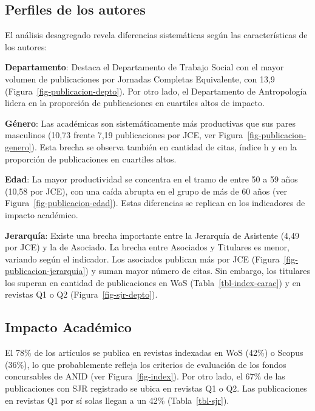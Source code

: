 \documentclass[
  spanish,
  a4paper,
  oneside]{scrbook}
\begin{document}
\subsection*{Perfiles de los autores}\label{perfiles-de-los-autores}

El análisis desagregado revela diferencias sistemáticas según las
características de los autores:

\textbf{Departamento}: Destaca el Departamento de Trabajo Social con el
mayor volumen de publicaciones por Jornadas Completas Equivalente, con
13,9 (Figura~\ref{fig-publicacion-depto}). Por otro lado, el
Departamento de Antropología lidera en la proporción de publicaciones en
cuartiles altos de impacto.

\textbf{Género}: Las académicas son sistemáticamente más productivas que
sus pares masculinos (10,73 frente 7,19 publicaciones por JCE, ver
Figura~\ref{fig-publicacion-genero}). Esta brecha se observa también en
cantidad de citas, índice h y en la proporción de publicaciones en
cuartiles altos.

\textbf{Edad}: La mayor productividad se concentra en el tramo de entre
50 a 59 años (10,58 por JCE), con una caída abrupta en el grupo de más
de 60 años (ver Figura~\ref{fig-publicacion-edad}). Estas diferencias se
replican en los indicadores de impacto académico.

\textbf{Jerarquía}: Existe una brecha importante entre la Jerarquía de
Asistente (4,49 por JCE) y la de Asociado. La brecha entre Asociados y
Titulares es menor, variando según el indicador. Los asociados publican
más por JCE (Figura~\ref{fig-publicacion-jerarquia}) y suman mayor
número de citas. Sin embargo, los titulares los superan en cantidad de
publicaciones en WoS (Tabla~\ref{tbl-index-carac}) y en revistas Q1 o Q2
(Figura~\ref{fig-sjr-depto}).

\subsection*{Impacto Académico}\label{impacto-acaduxe9mico}

El 78\% de los artículos se publica en revistas indexadas en WoS (42\%)
o Scopus (36\%), lo que probablemente refleja los criterios de
evaluación de los fondos concursables de ANID (ver
Figura~\ref{fig-index}). Por otro lado, el 67\% de las publicaciones con
SJR registrado se ubica en revistas Q1 o Q2. Las publicaciones en
revistas Q1 por sí solas llegan a un 42\% (Tabla~\ref{tbl-sjr}).
\end{document}
